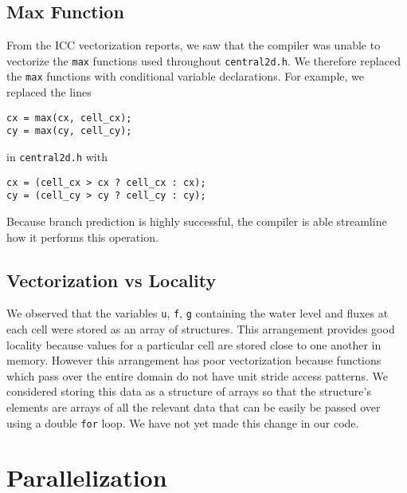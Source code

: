 \documentclass[12pt]{article}
\begin{document}
\subsection{Max Function}
From the ICC vectorization reports, we saw that the compiler was unable to vectorize the \texttt{max} functions used throughout \texttt{central2d.h}.
We therefore replaced the \texttt{max} functions with conditional variable declarations.
For example, we replaced the lines
\begin{verbatim}
cx = max(cx, cell_cx);
cy = max(cy, cell_cy);
\end{verbatim}
in \texttt{central2d.h} with
\begin{verbatim}
cx = (cell_cx > cx ? cell_cx : cx);
cy = (cell_cy > cy ? cell_cy : cy);
\end{verbatim}
Because branch prediction is highly successful, the compiler is able streamline how it performs this operation.

\subsection{Vectorization vs Locality}
We observed that the variables \texttt{u}, \texttt{f}, \texttt{g} containing the water level and fluxes at each cell were stored as an array of structures.
This arrangement provides good locality because values for a particular cell are stored close to one another in memory.
However this arrangement has poor vectorization because functions which pass over the entire domain do not have unit stride access patterns.
We considered storing this data as a structure of arrays so that the structure's elements are arrays of all the relevant data that can be easily be passed over using a double \texttt{for} loop.
We have not yet made this change in our code.

\section{Parallelization}
\end{document}
